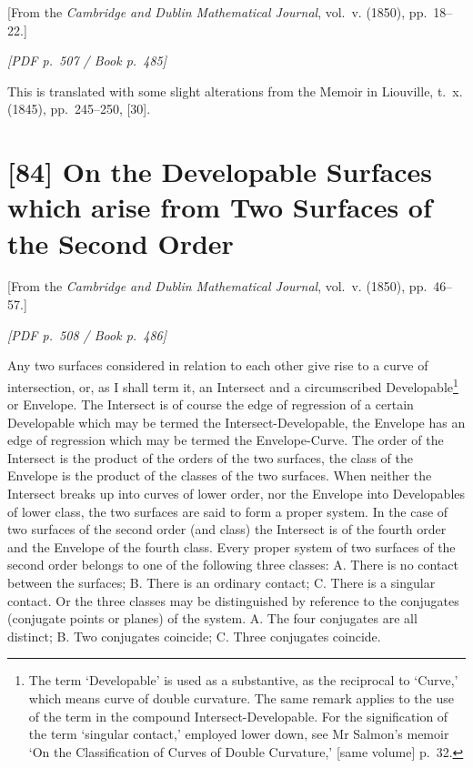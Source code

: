 \documentclass[11pt]{article}
\newcommand{\Page}[2]{\bigskip\noindent\textit{[PDF p.~#1 / Book p.~#2]}\par\smallskip}
\begin{document}
\begin{center}
[From the \textit{Cambridge and Dublin Mathematical Journal}, vol.~v. (1850),
pp.~18--22.]
\end{center}

\Page{507}{485}

This is translated with some slight alterations from the Memoir in Liouville,
t.~x. (1845), pp.~245--250, [30].

\section*{[84] On the Developable Surfaces which arise from Two Surfaces of the Second Order}

\begin{center}
[From the \textit{Cambridge and Dublin Mathematical Journal}, vol.~v. (1850),
pp.~46--57.]
\end{center}

\Page{508}{486}

Any two surfaces considered in relation to each other give rise to a curve of
intersection, or, as I shall term it, an Intersect and a circumscribed Developable\footnote{The
term `Developable' is used as a substantive, as the reciprocal to `Curve,' which means
curve of double curvature. The same remark applies to the use of the term in the
compound Intersect-Developable. For the signification of the term `singular contact,'
employed lower down, see Mr Salmon's memoir `On the Classification of Curves of
Double Curvature,' [same volume] p.~32.} or Envelope. The Intersect is of course
the edge of regression of a certain Developable which may be termed the
Intersect-Developable, the Envelope has an edge of regression which may be termed
the Envelope-Curve. The order of the Intersect is the product of the orders of the
two surfaces, the class of the Envelope is the product of the classes of the two
surfaces. When neither the Intersect breaks up into curves of lower order, nor the
Envelope into Developables of lower class, the two surfaces are said to form a proper
system. In the case of two surfaces of the second order (and class) the Intersect is
of the fourth order and the Envelope of the fourth class. Every proper system of two
surfaces of the second order belongs to one of the following three classes: A. There is
no contact between the surfaces; B. There is an ordinary contact; C. There is a
singular contact. Or the three classes may be distinguished by reference to the
conjugates (conjugate points or planes) of the system. A. The four conjugates are all
distinct; B. Two conjugates coincide; C. Three conjugates coincide.
\end{document}

